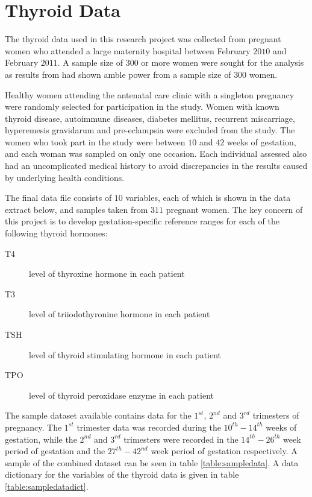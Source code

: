 \documentclass[12pt,a4paper]{report}
\begin{document}
\section{Thyroid Data}
The thyroid data used in this research project was collected from pregnant women who attended a large maternity hospital between February $2010$ and February $2011$. A sample size of $300$ or more women were sought for the analysis as results from \citet{Cotzias2008} had shown amble power from a sample size of $300$ women.
\vspace{2mm}

Healthy women attending the antenatal care clinic with a singleton pregnancy were randomly selected for participation in the study. Women with known thyroid disease, autoimmune diseases, diabetes mellitus, recurrent miscarriage, hyperemesis gravidarum and pre-eclampsia were excluded from the study. The women who took part in the study were between $10$ and $42$ weeks of gestation, and each woman was sampled on only one occasion. Each individual assessed also had an uncomplicated medical history to avoid discrepancies in the results caused by underlying health conditions.
\vspace{2mm}

The final data file consists of $10$ variables, each of which is shown in the data extract below, and samples taken from $311$ pregnant women. The key concern of this project is to develop gestation-specific reference ranges for each of the following thyroid hormones:
\begin{description}
    \item[T4] level of thyroxine hormone in each patient
    \item[T3] level of triiodothyronine hormone in each patient
    \item[TSH] level of thyroid stimulating hormone in each patient
    \item[TPO] level of thyroid peroxidase enzyme in each patient
\end{description}
\vspace{2mm}

The sample dataset available contains data for the $1^{st}$, $2^{nd}$ and $3^{rd}$ trimesters of pregnancy. The $1^{st}$ trimester data was recorded during the $10^{th}-14^{th}$ weeks of gestation, while the $2^{nd}$ and $3^{rd}$ trimesters were recorded in the $14^{th}-26^{th}$ week period of gestation and the $27^{th}-42^{nd}$ week period of gestation respectively.  A sample of the combined dataset can be seen in table \ref{table:sampledata}. A data dictionary for the variables of the thyroid data is given in table \ref{table:sampledatadict}.
\vspace{2mm}
\vspace{2mm}
\end{document}
